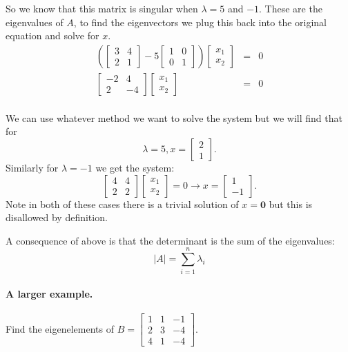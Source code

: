 So we know that this matrix is singular when $\lambda = 5$ and $-1$. 
These are the eigenvalues of $A$, to find the eigenvectors we plug this back into the original equation and solve for $x$. 
\[\begin{array}{rcl}
\left(\begin{bmatrix}3 & 4 \\ 2 & 1\end{bmatrix}-5\begin{bmatrix}1&0\\0&1\end{bmatrix}\right)\begin{bmatrix}x_1\\x_2\end{bmatrix} & = & 0\\
\begin{bmatrix}-2 & 4 \\ 2 & -4\end{bmatrix}\begin{bmatrix}x_1\\x_2\end{bmatrix} & = & 0\\
\end{array}\]

We can use whatever method we want to solve the system but we will find that for \[\lambda=5, x=\begin{bmatrix}2\\1\end{bmatrix}.\]
Similarly for $\lambda=-1$ we get the system:  
\[\begin{bmatrix}4 & 4 \\ 2 & 2\end{bmatrix}\begin{bmatrix}x_1\\x_2\end{bmatrix} = 0 \rightarrow x=\begin{bmatrix}1\\-1\end{bmatrix}.\]
Note in both of these cases there is a trivial solution of $x=\mathbf{0}$ but this is disallowed by definition. 

\begin{aside}
A consequence of above is that the determinant is the sum of the eigenvalues: \[|A|=\sum_{i=1}^n \lambda_i\]
\end{aside}

\paragraph{A larger example. }
Find the eigenelements of $B=\begin{bmatrix}1&1&-1\\2&3&-4\\4&1&-4\end{bmatrix}.$

